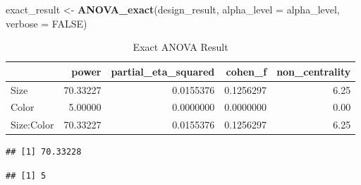 \documentclass[]{book}
\newenvironment{Shaded}{\begin{snugshade}}{\end{snugshade}}
\newcommand{\CommentTok}[1]{\textcolor[rgb]{0.56,0.35,0.01}{\textit{#1}}}
\newcommand{\DataTypeTok}[1]{\textcolor[rgb]{0.13,0.29,0.53}{#1}}
\newcommand{\KeywordTok}[1]{\textcolor[rgb]{0.13,0.29,0.53}{\textbf{#1}}}
\newcommand{\NormalTok}[1]{#1}
\newcommand{\OperatorTok}[1]{\textcolor[rgb]{0.81,0.36,0.00}{\textbf{#1}}}
\newcommand{\OtherTok}[1]{\textcolor[rgb]{0.56,0.35,0.01}{#1}}
\newcommand{\StringTok}[1]{\textcolor[rgb]{0.31,0.60,0.02}{#1}}
\begin{document}
\begin{Shaded}
\begin{Highlighting}[]
\NormalTok{exact_result <-}\StringTok{ }\KeywordTok{ANOVA_exact}\NormalTok{(design_result,}
                            \DataTypeTok{alpha_level =}\NormalTok{ alpha_level,}
                            \DataTypeTok{verbose =} \OtherTok{FALSE}\NormalTok{)}
\end{Highlighting}
\end{Shaded}

\begin{table}[!h]

\caption{\label{tab:unnamed-chunk-223}Exact ANOVA Result}
\centering
\begin{tabular}{l|r|r|r|r}
\hline
  & power & partial\_eta\_squared & cohen\_f & non\_centrality\\
\hline
Size & 70.33227 & 0.0155376 & 0.1256297 & 6.25\\
\hline
Color & 5.00000 & 0.0000000 & 0.0000000 & 0.00\\
\hline
Size:Color & 70.33227 & 0.0155376 & 0.1256297 & 6.25\\
\hline
\end{tabular}
\end{table}

\begin{Shaded}
\end{Shaded}

\begin{verbatim}
## [1] 70.33228
\end{verbatim}

\begin{Shaded}
\end{Shaded}

\begin{verbatim}
## [1] 5
\end{verbatim}

\begin{Shaded}
\end{Shaded}
\end{document}

